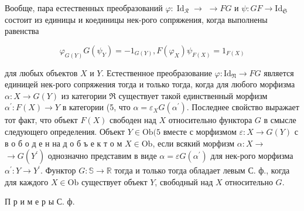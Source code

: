\documentclass[10pt]{article}
\begin{document}
Вообще, пара естественных преобразований $\varphi: \operatorname{Id}_{\mathscr{R}} \rightarrow$ $\rightarrow F G$ и $\psi: G F \rightarrow \mathrm{Id}_{\mathfrak{S}}$ состоит из единицы и коединицы нек-рого сопряжения, когда выполнены равенства



\[

\varphi_{G(Y)} G\left(\psi_{Y}\right)=-1_{G(Y)}, F\left(\varphi_{X}\right) \psi_{F(X)}=1_{F(X)}

\]



для любых объектов $X$ и $Y$. Естественное преобразование $\varphi: \mathrm{Id}_{\mathfrak{N}} \rightarrow F G$ является единицей нек-рого сопряжения тогда и только тогда, когда для любого морфизма $\alpha: X \rightarrow G(Y)$ из категории $\Re$ существует такой единственный морфизм $\alpha^{\prime}: F(X) \rightarrow Y$ в категории (5, что $\alpha=\varepsilon_{X} G\left(\alpha^{\prime}\right)$. Последнее свойство выражает тот факт, что объект $F(X)$ свободен над $X$ относительно функтора $G$ в смысле следующего определения. Объект $Y \in \mathrm{Ob}(5$ вместе с морфизмом $\varepsilon: X \rightarrow G(Y)$ с в о б о д е н на д о б ъ е к т о м $X \in \mathrm{Ob}$, если всякий морфизм $\alpha: X \rightarrow$ $\rightarrow G\left(Y^{\prime}\right)$ однозначно представим в виде $\alpha=\varepsilon G\left(\alpha^{\prime}\right)$ для нек-рого морфизма $\alpha^{\prime}: Y \rightarrow Y^{\prime}$. Функтор $G: \mathbb{S} \rightarrow \mathbb{R}$ тогда и только тогда обладает левым С. ф., когда для каждого $X \in \mathrm{Ob}$ существует объект $Y$, свободный над $X$ относительно $G$.



П р и м е р ы С. ф.
\end{document}
